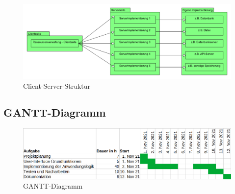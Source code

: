 \begin{figure}[htb]
	\centering
	\includegraphics[scale=0.4]{Bilder/Client-Server-Struktur.png}
	\caption{Client-Server-Struktur}
	\label{fig:ClientServer}
\end{figure} 

\subsection{GANTT-Diagramm}
\label{app:GanttDiagramm}

\begin{figure}[htb]
	\centering
	\includegraphics[scale=0.9]{Bilder/Gantt-Diagramm.png}
	\caption{GANTT-Diagramm}
	\label{fig:Gantt}
\end{figure} 